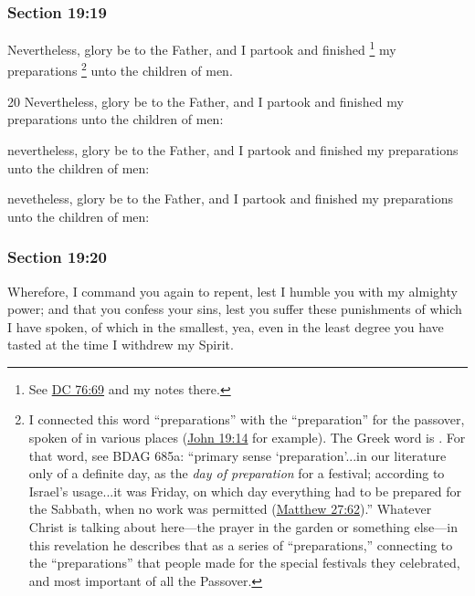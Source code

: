 	\subsubsection{Section 19:19} %
		\label{DC19-19}

		Nevertheless, glory be to the Father, and I partook and finished%
			\footnote{%
				See \hyperref[DC76-69]{DC 76:69} and my notes there.
				}
		my preparations%
			\footnote{%
				I connected this word ``preparations'' with the ``preparation'' for the passover, spoken of in various places (\hyperref[JOHN-19-14]{John 19:14} for example). The Greek word is . For that word, see BDAG 685a: ``primary sense `preparation'...in our literature only of a definite day, as the \textit{day of preparation} for a festival; according to Israel's usage...it was Friday, on which day everything had to be prepared for the Sabbath, when no work was permitted (\hyperref[MATTHEW-27-62]{Matthew 27:62}).'' Whatever Christ is talking about here---the prayer in the garden or something else---in this revelation he describes that as a series of ``preparations,'' connecting to the ``preparations'' that people made for the special festivals they celebrated, and most important of all the Passover.
				}
		unto the children of men.

		\begin{framed}
		\scriptsize
			\begin{compactdesc}
				\item[JSP] 20 Nevertheless, glory be to the Father, and I partook and finished my preparations unto the children of men:
				\item[RB1] [\textit{missing}]
				\item[DC 1835] nevertheless, glory be to the Father, and I partook and finished my preparations unto the children of men: 
				\item[DC 1844] nevetheless, glory be to the Father, and I partook and finished my preparations unto the children of men: 
			\end{compactdesc}
		\end{framed}

	\subsubsection{Section 19:20} %
		\label{DC19-20}

		Wherefore, I command you again to repent, lest I humble you with my almighty power; and that you confess your sins, lest you suffer these punishments of which I have spoken, of which in the smallest, yea, even in the least degree you have tasted at the time I withdrew my Spirit.

